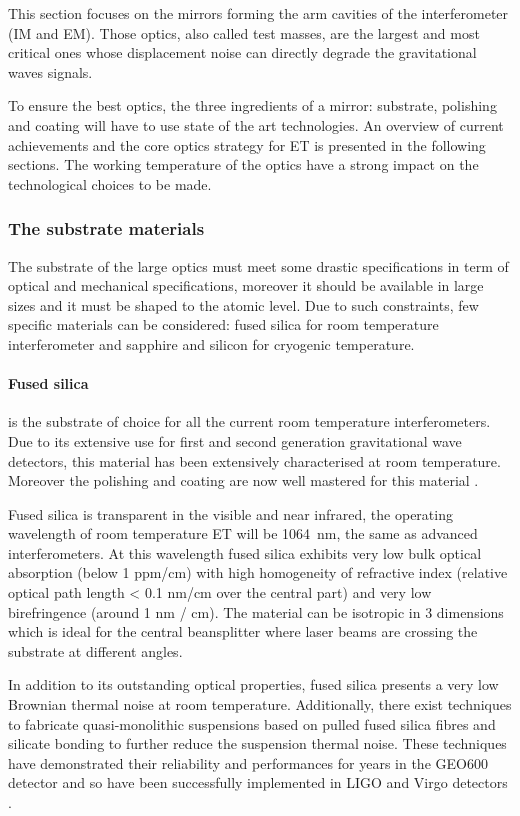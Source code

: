 This section focuses on the mirrors forming the arm cavities of the interferometer (IM and EM). Those optics, also called test masses, are the largest and most critical ones whose displacement noise can directly degrade the gravitational waves signals.

To ensure the best optics, the three ingredients of a mirror: substrate, polishing and coating will have to use state of the art technologies. An overview of current achievements and the core optics strategy for ET is presented in the following sections. The working temperature of the optics have a strong impact on the technological choices to be made. 

\subsubsection{The substrate materials}

The substrate of the large optics must meet some drastic specifications in term of optical and mechanical specifications, moreover it should be available in large sizes and it must be shaped to the atomic level. Due to such constraints, few specific materials can be considered: fused silica for room temperature interferometer and sapphire and silicon for cryogenic temperature.\\

\paragraph{Fused silica} is the substrate of choice for all the current room temperature interferometers.  Due to its extensive
use for first and second generation gravitational wave detectors, this material has been extensively characterised at room temperature. Moreover the polishing and coating are now well mastered for this material \cite{pinard2017mirrors}.

Fused silica is transparent in the visible and near infrared, the operating wavelength of room temperature ET will be 1064~nm, the same as advanced interferometers. At this wavelength fused silica exhibits very low bulk optical absorption (below 1 ppm/cm) with high homogeneity of refractive index (relative optical path length < 0.1 nm/cm over the central part) and very low birefringence (around 1 nm / cm). The material can be isotropic in 3 dimensions which is ideal for the central beansplitter where laser beams are crossing the substrate at different angles.

In addition to its outstanding optical properties, fused silica presents a very low Brownian thermal noise at room temperature. Additionally, there exist techniques to fabricate quasi-monolithic suspensions based on pulled fused silica fibres and silicate bonding to further reduce the suspension thermal noise. These techniques have demonstrated their reliability and performances for years in the GEO600 detector \cite{plissi1998aspects} and so have been successfully implemented in LIGO and Virgo detectors \cite{robertson2002quadruple,lorenzini2010monolithic}.


